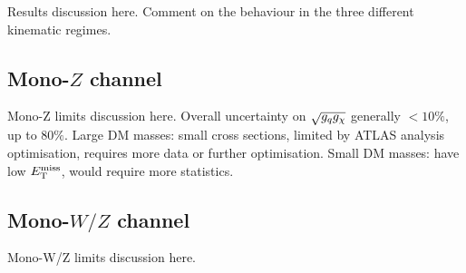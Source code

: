 Results discussion here. Comment on the behaviour in the three different kinematic regimes.

\subsection{Mono-$Z$ channel}

Mono-Z limits discussion here. Overall uncertainty on $\sqrt{g_q g_{\chi}}$ generally $ < 10\%$, up to 80$\%$. Large DM masses: small cross sections, limited by ATLAS analysis optimisation, requires more data or further optimisation. Small DM masses: have low $E_{\mathrm{T}}^{\mathrm{miss}}$, would require more statistics.

\subsection{Mono-$W/Z$ channel}

Mono-W/Z limits discussion here.
\afterpage{\clearpage}


